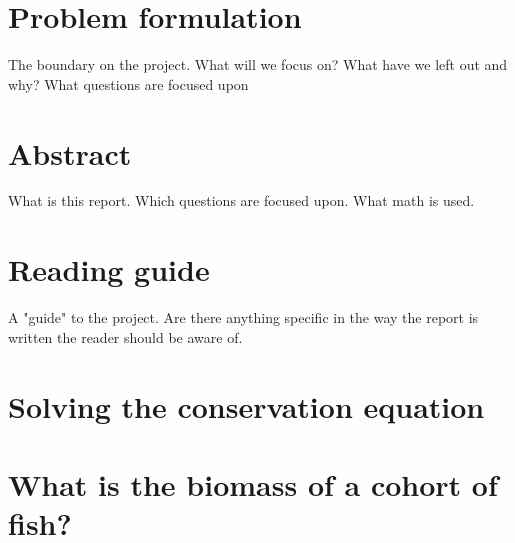 \documentclass{article}
\begin{document}
\section*{Problem formulation}
The boundary on the project. What will we focus on? What have we left out and why? What questions are focused upon
\newpage
\section*{Abstract}
What is this report.
Which questions are focused upon.
What math is used.
\newpage
\section*{Reading guide}
A "guide" to the project. Are there anything specific in the way the report is written the reader should be aware of.
\newpage


\cleardoublepage
%

\tableofcontents 
\thispagestyle{empty} %
\cleardoublepage
\setcounter{page}{1}
%


\section{Solving the conservation equation}\label{sec:Ex1}
\subsection{}\label{sec:Ex1A}

\newpage



\section{What is the biomass of a cohort of fish?}\label{sec:Ex2}
\subsection{}\label{sec:Ex2A}

\newpage
\end{document}
